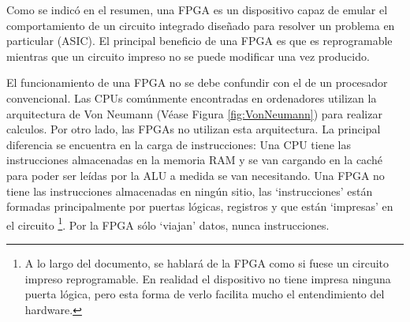 Como se indicó en el resumen, una FPGA es un dispositivo capaz de emular
el comportamiento de un circuito integrado diseñado para resolver un problema
en particular (ASIC).
El principal beneficio de una FPGA es que es reprogramable
mientras que un circuito impreso no se puede modificar una vez producido.

El funcionamiento de una FPGA no se debe confundir con el de un procesador convencional.
Las CPUs comúnmente encontradas en ordenadores utilizan la arquitectura de Von Neumann
(Véase Figura \ref{fig:VonNeumann}) para realizar calculos.
Por otro lado, las FPGAs no utilizan esta arquitectura.
La principal diferencia se encuentra en la carga de instrucciones:
Una CPU tiene las instrucciones almacenadas en la memoria RAM
y se van cargando en la caché para poder ser leídas por la ALU
a medida se van necesitando.
Una FPGA no tiene las instrucciones almacenadas en ningún sitio,
las `instrucciones' están formadas principalmente por  puertas lógicas, registros y
 que están `impresas' en el circuito
\footnote{
    A lo largo del documento, se hablará de la FPGA como si fuese un circuito impreso
    reprogramable.
    En realidad el dispositivo no tiene impresa ninguna puerta lógica,
    pero esta forma de verlo facilita mucho el entendimiento del hardware.
}.
Por la FPGA sólo `viajan' datos, nunca instrucciones.

